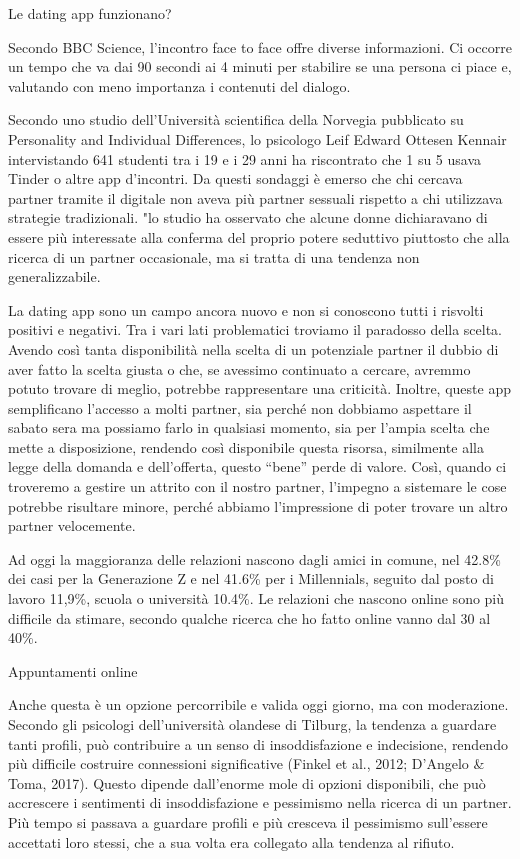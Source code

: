 \documentclass[12pt]{book} %
\begin{document}
\begin{mdframed}[linewidth=1pt]
Le dating app funzionano?

Secondo BBC Science, l'incontro face to face offre
diverse informazioni. Ci occorre un tempo che va dai 90 secondi ai 4 minuti per stabilire se una persona ci piace e,
valutando con meno importanza i contenuti del dialogo.

Secondo uno studio dell'Università scientifica della Norvegia pubblicato su Personality and Individual Differences, lo
psicologo Leif Edward Ottesen Kennair intervistando 641 studenti tra i 19 e i 29 anni ha riscontrato che 1 su 5 usava
Tinder o altre app d'incontri. Da questi sondaggi è emerso che chi cercava partner tramite il digitale non aveva più
partner sessuali rispetto a chi utilizzava strategie tradizionali. "lo studio ha osservato che alcune donne dichiaravano di essere più interessate alla conferma del proprio potere seduttivo piuttosto che alla ricerca di un partner occasionale, ma si tratta di una tendenza non generalizzabile.

La dating app sono un campo ancora nuovo e non si conoscono tutti i risvolti positivi e negativi. Tra i vari lati
problematici troviamo il paradosso della scelta. Avendo così tanta disponibilità nella scelta di un potenziale partner
il dubbio di aver fatto la scelta giusta o che, se avessimo continuato a cercare, avremmo potuto trovare di meglio,
potrebbe rappresentare una criticità. Inoltre, queste app semplificano l'accesso a molti partner,
sia perché non dobbiamo aspettare il sabato sera ma possiamo farlo in qualsiasi momento, sia per
l'ampia scelta che mette a disposizione, rendendo così disponibile questa risorsa, similmente alla
legge della domanda e dell'offerta, questo “bene” perde di valore. Così, quando ci troveremo a
gestire un attrito con il nostro partner, l'impegno a sistemare le cose potrebbe risultare minore,
perché abbiamo l'impressione di poter trovare un altro partner velocemente.

Ad oggi la maggioranza delle relazioni nascono dagli amici in comune, nel 42.8\% dei casi per la Generazione Z e nel
41.6\% per i Millennials, seguito dal posto di lavoro 11,9\%, scuola o università 10.4\%. Le relazioni che nascono
online sono più difficile da stimare, secondo qualche ricerca che ho fatto online vanno dal 30 al
40\%.

Appuntamenti online

Anche questa è un opzione percorribile e valida oggi giorno, ma con moderazione. Secondo gli psicologi dell'università
olandese di Tilburg, la  tendenza a guardare tanti profili, può contribuire a un senso di insoddisfazione e indecisione, rendendo più difficile costruire connessioni significative (Finkel et al., 2012; D’Angelo \& Toma, 2017). Questo dipende dall'enorme mole di opzioni disponibili, che può accrescere i sentimenti
di insoddisfazione e pessimismo nella ricerca di un partner. Più tempo si passava a guardare profili e più cresceva il
pessimismo sull'essere accettati loro stessi, che a sua volta era collegato alla tendenza al rifiuto.
\end{mdframed}
\end{document}
